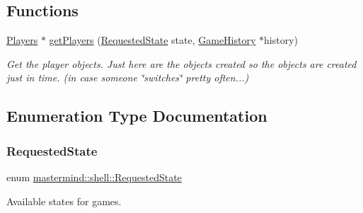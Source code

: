 \subsection*{Functions}
\begin{DoxyCompactItemize}
\item 
\hyperlink{classmastermind_1_1shell_1_1_players}{Players} $\ast$ \hyperlink{namespacemastermind_1_1shell_a516fea896c290c75364c483e71389b3d}{get\+Players} (\hyperlink{namespacemastermind_1_1shell_ad060dfaf42b2c0f7827708f0d0046ede}{Requested\+State} state, \hyperlink{classmastermind_1_1logic_1_1_game_history}{Game\+History} $\ast$history)
\begin{DoxyCompactList}\small\item\em Get the player objects. Just here are the objects created so the objects are created just in time. (in case someone \char`\"{}switches\char`\"{} pretty often...) \end{DoxyCompactList}\end{DoxyCompactItemize}


\subsection{Enumeration Type Documentation}
\hypertarget{namespacemastermind_1_1shell_ad060dfaf42b2c0f7827708f0d0046ede}{}\label{namespacemastermind_1_1shell_ad060dfaf42b2c0f7827708f0d0046ede} 
\subsubsection{\texorpdfstring{Requested\+State}{RequestedState}}
{\footnotesize\ttfamily enum \hyperlink{namespacemastermind_1_1shell_ad060dfaf42b2c0f7827708f0d0046ede}{mastermind\+::shell\+::\+Requested\+State}}



Available states for games. 


